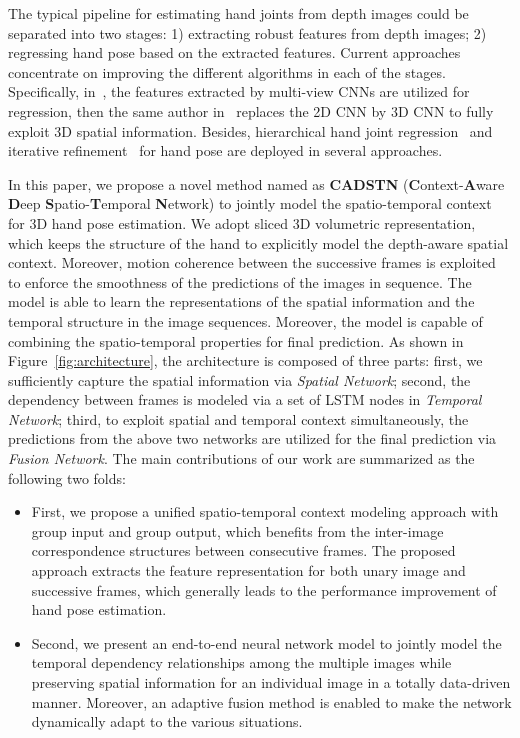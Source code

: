 \documentclass[journal,comsoc]{IEEEtran}
\begin{document}
The typical pipeline for estimating hand joints from depth images could be separated into two stages: 1) extracting robust features
from depth images; 2) regressing hand pose based on the extracted features. Current approaches concentrate on improving the different
algorithms in each of the stages. Specifically, in~\cite{Ge_2016_CVPR}, the features
extracted by multi-view CNNs are utilized for regression, then the same author in~\cite{Ge_2017_CVPR} replaces the 2D CNN by 3D CNN
to fully exploit 3D spatial information. Besides, hierarchical hand joint regression~\cite{ye2016spatial} and iterative
refinement~\cite{oberweger2015hands,oberweger2015training} for hand pose are deployed in several approaches.

In this paper, we propose a novel method named as \textbf{CADSTN} (\textbf{C}ontext-\textbf{A}ware \textbf{D}eep \textbf{S}patio-\textbf{T}emporal \textbf{N}etwork)
to jointly model the spatio-temporal context for 3D hand pose estimation. We adopt sliced 3D volumetric representation, which keeps the structure of the hand to explicitly model
the depth-aware spatial context. Moreover, motion coherence between the successive frames is
exploited to enforce the smoothness of the predictions of the images in sequence. The model is able to learn the representations of the spatial
information and the temporal structure in the image sequences. Moreover, the model is capable of combining the spatio-temporal
properties for final prediction. As shown in Figure~\ref{fig:architecture}, the architecture is
composed of three parts: first, we sufficiently capture the spatial information via \emph{Spatial Network}; second, the dependency between
frames is modeled via a set of LSTM nodes in \emph{Temporal Network}; third, to exploit spatial and temporal context simultaneously,
the predictions from the above two networks are utilized for the final prediction via \emph{Fusion Network}. The main contributions of our work are summarized as the following two folds:
\begin{itemize}
  \item 
  First, we propose a unified spatio-temporal context modeling approach with group input and group output, which benefits from the inter-image
  correspondence structures between consecutive frames. The proposed approach extracts the feature representation for both unary image and
  successive frames, which generally leads to the performance improvement of hand pose estimation.
  \item 
  Second, we present an end-to-end neural network model to jointly model the temporal dependency relationships among the multiple images while
  preserving spatial information for an individual image in a totally data-driven manner. Moreover, an adaptive fusion method is enabled to make
  the network dynamically adapt to the various situations.
\end{itemize}
\end{document}
